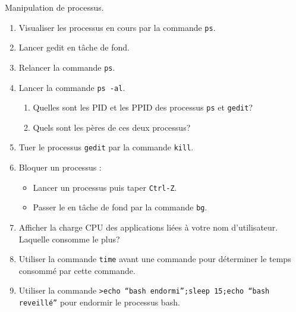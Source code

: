 \documentclass[a4paper,11pt]{exam}
\begin{document}


{
	Manipulation de processus.
	\begin{enumerate}
	\item Visualiser les processus en cours par la commande \texttt{ps}.
	\item Lancer gedit en tâche de fond.
	\item Relancer la commande \texttt{ps}.
	\item Lancer la commande \texttt{ps -al}.
	    \begin{enumerate}
	    \item Quelles sont les PID et les PPID des processus \texttt{ps} et \texttt{gedit}?
	    \item Quels sont les pères de ces deux processus?
	    \end{enumerate}
	\item Tuer le processus \texttt{gedit} par la commande \texttt{kill}.
	\item Bloquer un processus :
	    \begin{itemize}
	    \item Lancer un processus puis taper \texttt{Ctrl-Z}. 
	    \item Passer le en tâche de fond par la commande \texttt{bg}.
	    \end{itemize}
	 \item Afficher la charge CPU des applications liées à votre nom d'utilisateur. Laquelle consomme le plus?
 	\item Utiliser la commande \texttt{time} avant une commande pour déterminer le temps consommé par cette commande.
 	\item Utiliser la commande \texttt{>echo ``bash endormi'';sleep 15;echo ``bash reveillé''} pour endormir le processus bash.
	\end{enumerate}
}

\end{document}
